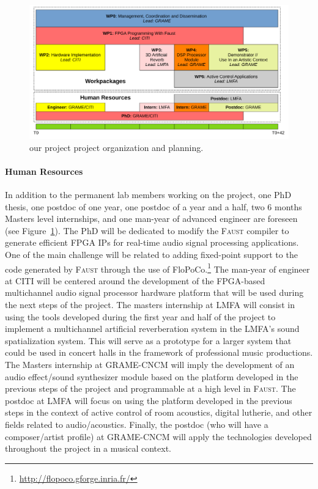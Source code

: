 \documentclass[a4paper,10pt]{article}
\newcommand{\F}{\textsc{Faust}}
\newcommand{\PP}{our project}
\begin{document}
\begin{figure}[h]
  \centering
  \includegraphics[width=\columnwidth]{img/wp}
  \caption{\PP{} project organization and planning.}
  \label{fig:wp}
\end{figure}

\paragraph{Human Resources}

In addition to the permanent lab members working on the project, one PhD thesis, one postdoc of one year, one postdoc of a year and a half, two 6 months Masters level internships, and one man-year of advanced engineer are foreseen (see Figure~\ref{fig:wp}). The PhD will be dedicated to modify the \F{} compiler to generate efficient FPGA IPs for real-time audio signal processing applications. One of the main challenge will be related to adding fixed-point support to the code generated by \F{} through the use of FloPoCo.\footnote{\url{http://flopoco.gforge.inria.fr/}} The man-year of engineer at CITI will be centered around the development of the FPGA-based multichannel audio signal processor hardware platform that will be used during the next steps of the project. The masters internship at LMFA will consist in using the tools developed during the first year and half of the project to implement a multichannel artificial reverberation system in the LMFA's sound spatialization system. This will serve as a prototype for a larger system that could be used in concert halls in the framework of professional music productions. The Masters internship at GRAME-CNCM will imply the development of an audio effect/sound synthesizer module based on the platform developed in the previous steps of the project and programmable at a high level in \F{}. The postdoc at LMFA will focus on using the platform developed in the previous steps in the context of active control of room acoustics, digital lutherie, and other fields related to audio/acoustics. Finally, the postdoc (who will have a composer/artist profile) at GRAME-CNCM will apply the technologies developed throughout the project in a musical context.
\end{document}
